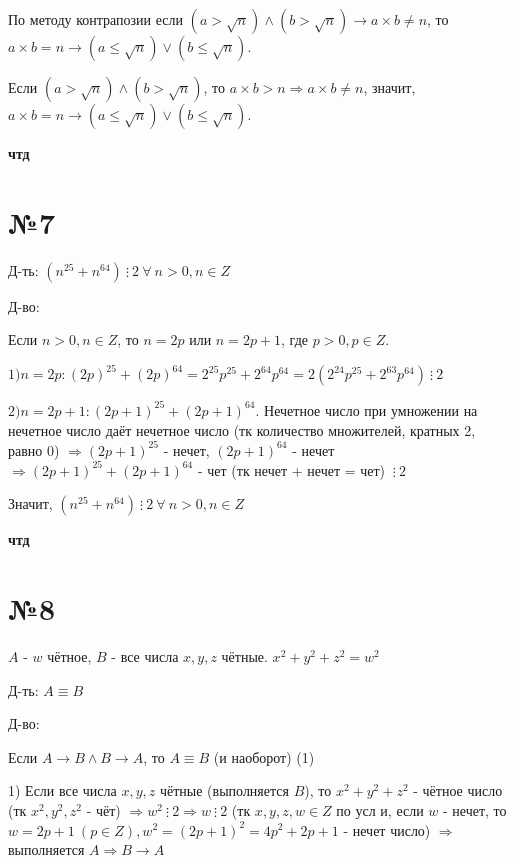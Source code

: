 \documentclass[a4paper,16pt]{article}
\begin{document}
		По методу контрапозии если $(a > \sqrt{n}) \land (b > \sqrt{n}) \to a \times b \ne n$, то $a \times b = n \to (a \leq \sqrt{n}) \lor (b \leq \sqrt{n}) $.
		
		Если $(a > \sqrt{n}) \land (b > \sqrt{n})$, то $a \times b > n\Rightarrow a \times b \ne n$, значит, $a \times b = n \to (a \leq \sqrt{n}) \lor (b \leq \sqrt{n}) $.
		
		\begin{flushright}
			\textbf{чтд}
		\end{flushright}
	
	\section*{№7}
	
	Д-ть: $(n^{25} + n^{64})\ \vdots \ 2\  \forall \ n > 0, n \in Z$
	
	Д-во:
	
	Если $n > 0, n \in Z$, то $ n = 2p$ или $ n = 2p + 1$, где $p >0, p \in Z$.
	
	$1) n = 2p: (2p)^{25} + (2p) ^ {64}  = 2^{25}p^{25} + 2^{64}p^{64} = 2(2^{24}p^{25} + 2^{63}p^{64}) \ \vdots \ 2$
	
	$2) n = 2p + 1: (2p + 1)^{25} + (2p + 1) ^ {64}$. Нечетное число при умножении на нечетное число даёт нечетное число (тк количество множителей, кратных 2, равно 0) 
	$ \Rightarrow (2p + 1)^{25}$ - нечет, $(2p + 1) ^ {64}$ - нечет $ \Rightarrow (2p + 1)^{25} + (2p + 1) ^ {64} $ - чет (тк нечет + нечет = чет) $  \ \vdots \ 2$
	
	Значит, $(n^{25} + n^{64})\ \vdots \ 2 \  \forall \ n > 0, n \in Z$
	
	\begin{flushright}
		\textbf{чтд}
	\end{flushright}

\section*{№8}

	$A$ - $w$ чётное, $B$ - все числа $x, y, z$ чётные.
	$x^2+y^2+z^2=w^2$
	
	Д-ть: $A \equiv B$
	
	Д-во:
	
	Если $A \to B \land B \to A$, то $A \equiv B$ (и наоборот) (1)
	
	1) Если все числа $x, y, z$ чётные (выполняется $B$), то $x^2+y^2+z^2$ - чётное число (тк $x^2, y^2, z^2$ - чёт) $\Rightarrow w^2 \ \vdots \ 2 \Rightarrow w  \ \vdots \ 2$ 
	(тк $x, y, z, w \in Z$ по усл и, если $w$ - нечет, то $ w = 2p + 1 \ (p \in Z), w^2=(2p+1)^2
	= 4p^2 + 2p + 1$ - нечет число)
	$	\Rightarrow$ выполняется $ A \Rightarrow B \to A$	
	
\end{document}
